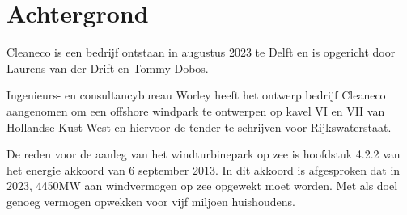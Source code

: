 \section{Achtergrond}
Cleaneco is een bedrijf ontstaan in augustus 2023 te Delft en is opgericht door Laurens van der Drift en Tommy Dobos.

Ingenieurs- en consultancybureau Worley heeft het ontwerp bedrijf Cleaneco aangenomen om een \gls{offshore} windpark te ontwerpen op kavel VI en VII van Hollandse Kust West en hiervoor de \gls{tender} te schrijven voor Rijkswaterstaat. 

De reden voor de aanleg van het windturbinepark op zee is hoofdstuk 4.2.2 van het \gls{energie akkoord}\cite{energieakkoord} van 6 september 2013. In dit akkoord is afgesproken dat in 2023, 4450MW aan windvermogen op zee opgewekt moet worden. Met als doel genoeg vermogen opwekken voor vijf miljoen huishoudens. 
